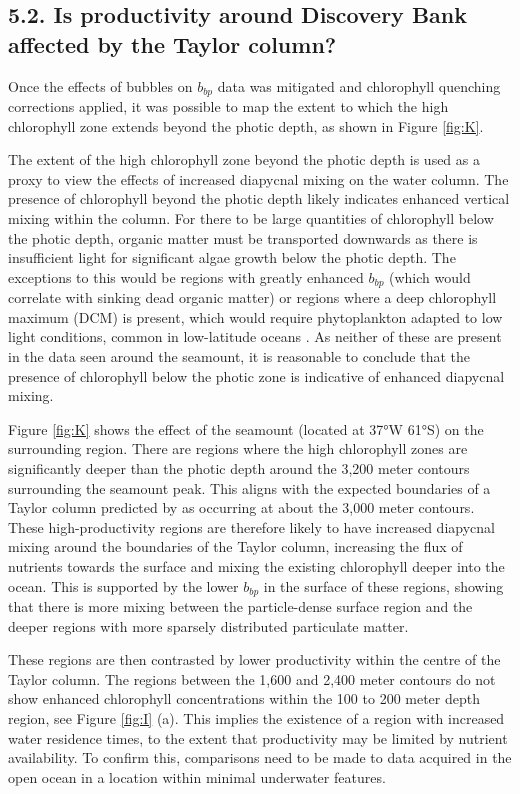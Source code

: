\documentclass[
	a4paper, %
	10pt, %
	unnumberedsections, %
	twoside, %
]{LTJournalArticle}
\begin{document}
\begin{multicols}{2}


\subsection{5.2. Is productivity around Discovery Bank affected by the Taylor column?} 
Once the effects of bubbles on $b_{bp}$ data was mitigated and chlorophyll quenching corrections applied, it was possible to map the extent
to which the high chlorophyll zone extends beyond the photic depth, as shown in Figure \ref{fig:K}. 

The extent of the high chlorophyll zone beyond the photic depth is used as a proxy to view the effects of increased diapycnal mixing on the
water column. The presence of chlorophyll beyond the photic depth likely indicates enhanced vertical mixing within the column. For there to be
large quantities of chlorophyll below the photic depth, organic matter must be transported downwards as there is insufficient light for significant
algae growth below the photic depth. The exceptions to this would be regions with greatly enhanced $b_{bp}$ (which would correlate with sinking
dead organic matter) or regions where a deep chlorophyll maximum (DCM) is present, which would require phytoplankton adapted to low light
conditions, common in low-latitude oceans \citep{ref58}. As neither of these are present in the data seen around the seamount,
it is reasonable to conclude that the presence of chlorophyll below the photic zone is indicative of enhanced diapycnal mixing.

Figure \ref{fig:K} shows the effect of the seamount (located at 37°W 61°S) on the surrounding region. There are regions where the high chlorophyll
zones are significantly deeper than the photic depth around the 3,200 meter contours surrounding the seamount peak. This aligns with the expected boundaries
of a Taylor column predicted by \citet{ref2} as occurring at about the 3,000 meter contours. These high-productivity regions are therefore likely to have increased
diapycnal mixing around the boundaries of the Taylor column, increasing the flux of nutrients towards the surface and mixing the existing chlorophyll deeper into
the ocean. This is supported by the lower $b_{bp}$ in the surface of these regions, showing that there is more mixing between the particle-dense surface region
and the deeper regions with more sparsely distributed particulate matter.


These regions are then contrasted by lower productivity within the centre of the Taylor column. The regions between the 1,600 and 2,400 meter
contours do not show enhanced chlorophyll concentrations within the 100 to 200 meter depth region, see Figure \ref{fig:I} (a). This implies the existence
of a region with increased water residence times, to the extent that productivity may be limited by nutrient availability. To confirm this,
comparisons need to be made to data acquired in the open ocean in a location within minimal underwater features.


\end{multicols}
\end{document}
